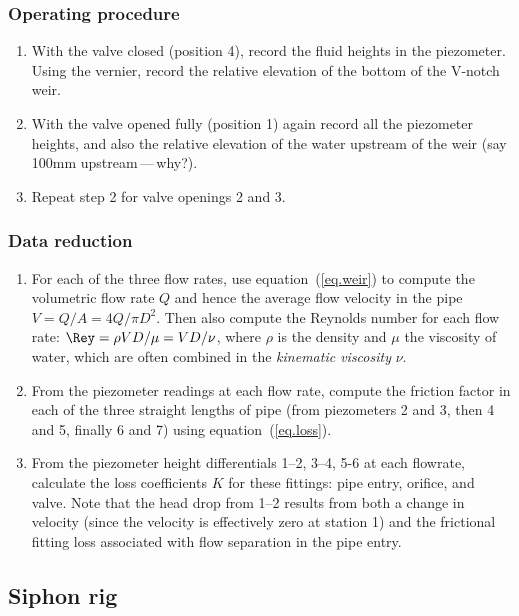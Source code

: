 \documentclass[a4paper,11pt]{article} \pagestyle{plain}
\begin{document}
\subsubsection*{Operating procedure}
\begin{enumerate}
\item
With the valve closed (position 4), record the fluid heights in the
piezometer. Using the vernier, record the relative elevation of the
bottom of the V-notch weir.
\item
With the valve opened fully (position 1) again record all the
piezometer heights, and also the relative elevation of the water
upstream of the weir (say 100mm upstream\,---\,why?).
\item
Repeat step 2 for valve openings 2 and 3.
\end{enumerate}

\subsubsection*{Data reduction}
\begin{enumerate}
\item
For each of the three flow rates, use equation~(\ref{eq.weir}) to
compute the volumetric flow rate $Q$ and hence the average flow
velocity in the pipe $V=Q/A=4Q/\pi D^2$. Then also compute the
Reynolds number for each flow rate: $\Rey=\rho VD/\mu=VD/\nu$, where
$\rho$ is the density and $\mu$ the viscosity of water, which are
often combined in the \emph{kinematic viscosity} $\nu$.
\item
From the piezometer readings at each flow rate, compute the friction
factor in each of the three straight lengths of pipe (\ie from
piezometers 2 and 3, then 4 and 5, finally 6 and 7) using
equation~(\ref{eq.loss}).
\item
From the piezometer height differentials 1--2, 3--4, 5-6 at each
flowrate, calculate the loss coefficients $K$ for these fittings: pipe
entry, orifice, and valve. Note that the head drop from 1--2 results
from both a change in velocity (since the velocity is effectively zero
at station 1) and the frictional fitting loss associated with flow
separation in the pipe entry.
\end{enumerate}

\subsection*{Siphon rig}
\end{document}
